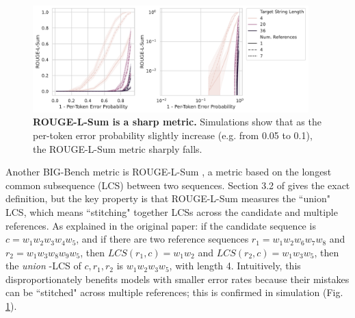 \begin{figure}
    \centering
    \includegraphics[width=0.95\textwidth]{figures/rouge_understanding/rougeLsum_vs_token_error_prob_scaling_simulation.pdf}
    \caption{\textbf{ROUGE-L-Sum is a sharp metric.} Simulations show that as the per-token error probability slightly increase (e.g. from 0.05 to 0.1), the ROUGE-L-Sum metric sharply falls.}
    \label{fig:app:metric_scaling:rougeLsum}
\end{figure}


Another BIG-Bench metric \cite{srivastava2022beyond} is ROUGE-L-Sum \cite{lin2004rouge}, a metric based on the longest common subsequence (LCS) between two sequences. Section 3.2 of \cite{lin2004rouge} gives the exact definition, but the key property is that ROUGE-L-Sum measures the ``union" LCS, which means ``stitching" together LCSs across the candidate and multiple references. As explained in the original paper: if the candidate sequence is $c = w_1 w_2 w_3 w_4 w_5$, and if there are two reference sequences $r_1 = w_1 w_2 w_6 w_7 w_8$ and $r_2 = w_1 w_3 w_8 w_9 w_5$, then $LCS(r_1, c) = w_1 w_2$ and $LCS(r_2, c) =w_1 w_3 w_5$, then the \textit{union} 
-LCS of $c, r_1, r_2$ is $w_1 w_2 w_3 w_5$, with length 4. Intuitively, this disproportionately benefits models with smaller error rates because their mistakes can be ``stitched" across multiple references; this is confirmed in simulation (Fig. \ref{fig:app:metric_scaling:rougeLsum}).





